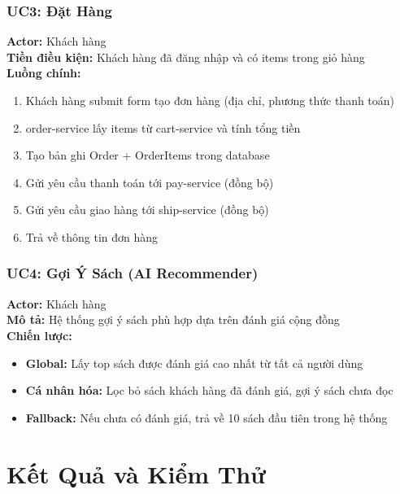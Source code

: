 \documentclass[12pt,a4paper]{article}
\begin{document}
\subsubsection{UC3: Đặt Hàng}

\begin{tcolorbox}[servicebox, title={Use Case: Đặt Hàng}]
  \textbf{Actor:} Khách hàng \\
  \textbf{Tiền điều kiện:} Khách hàng đã đăng nhập và có items trong giỏ hàng \\[0.3cm]
  \textbf{Luồng chính:}
  \begin{enumerate}
    \item Khách hàng submit form tạo đơn hàng (địa chỉ, phương thức thanh toán)
    \item order-service lấy items từ cart-service và tính tổng tiền
    \item Tạo bản ghi Order + OrderItems trong database
    \item Gửi yêu cầu thanh toán tới pay-service (đồng bộ)
    \item Gửi yêu cầu giao hàng tới ship-service (đồng bộ)
    \item Trả về thông tin đơn hàng
  \end{enumerate}
\end{tcolorbox}

\subsubsection{UC4: Gợi Ý Sách (AI Recommender)}

\begin{tcolorbox}[servicebox, title={Use Case: Gợi Ý Sách}]
  \textbf{Actor:} Khách hàng \\
  \textbf{Mô tả:} Hệ thống gợi ý sách phù hợp dựa trên đánh giá cộng đồng \\[0.3cm]
  \textbf{Chiến lược:}
  \begin{itemize}
    \item \textbf{Global:} Lấy top sách được đánh giá cao nhất từ tất cả người dùng
    \item \textbf{Cá nhân hóa:} Lọc bỏ sách khách hàng đã đánh giá, gợi ý sách chưa đọc
    \item \textbf{Fallback:} Nếu chưa có đánh giá, trả về 10 sách đầu tiên trong hệ thống
  \end{itemize}
\end{tcolorbox}

\section{Kết Quả và Kiểm Thử}
\end{document}
